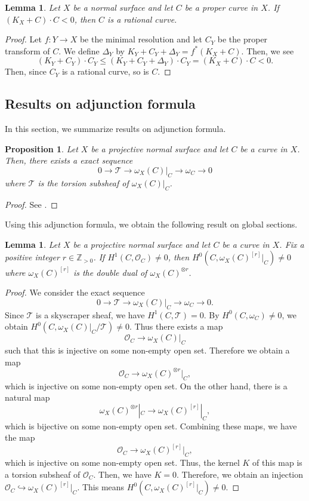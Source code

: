 \documentclass[12pt,twoside]{amsart}
\newtheorem{lem}[thm]{Lemma}
\newtheorem{prop}[thm]{Proposition}
\theoremstyle{definition}
\begin{document}
\begin{lem}\label{non-qcar-rational}
Let $X$ be a normal surface and 
let $C$ be a proper curve in $X$. 
If $(K_X+C)\cdot C<0$, then $C$ is a rational curve. 
\end{lem}

\begin{proof}
Let $f:Y\to X$ be the minimal resolution and 
let $C_Y$ be the proper transform of $C$. 
We define $\Delta_Y$ by $K_Y+C_Y+\Delta_Y=f^*(K_X+C).$ 
Then, we see 
$$(K_Y+C_Y)\cdot C_Y\leq (K_Y+C_Y+\Delta_Y)\cdot C_Y=(K_X+C)\cdot C<0.$$
Then, since $C_Y$ is a rational curve, so is $C$. 
\end{proof}


\subsection{Results on adjunction formula}
In this section, we summarize results on adjunction formula. 

\begin{prop}
Let $X$ be a projective normal surface and 
let $C$ be a curve in $X$. 
Then, there exists a exact sequence  
$$0\to \mathcal T \to \omega_X(C)|_C \to \omega_C \to 0$$
where $\mathcal T$ is the torsion subsheaf of $\omega_X(C)|_C$.
\end{prop}

\begin{proof}
See \cite[Lemma~4.4]{Fujino}.
\end{proof}

Using this adjunction formula, 
we obtain the following result on global sections. 

\begin{lem}\label{adjunctionlemma}
Let $X$ be a projective normal surface and 
let $C$ be a curve in $X$. 
Fix a positive integer $r\in\mathbb Z_{>0}$. 
If $H^1(C, \mathcal{O}_C)\neq 0$, then 
$H^0(C, \omega_X(C)^{[r]}|_C)\neq 0$ where 
$\omega_X(C)^{[r]}$ is the double dual of 
$\omega_X(C)^{\otimes r}$. 
\end{lem}

\begin{proof}
We consider the exact sequence 
$$0\to \mathcal T \to \omega_X(C)|_C \to \omega_C \to 0.$$
Since $\mathcal T$ is a skyscraper sheaf, we have 
$H^1(C, \mathcal T)=0$. 
By $H^0(C, \omega_C)\neq 0$, 
we obtain $H^0(C, \omega_X(C)|_C/\mathcal T)\neq 0$. 
Thus there exists a map
$$\mathcal O_{C} \to \omega_X(C)|_C$$
such that this is injective on some non-empty open set. 
Therefore we obtain a map
$$\mathcal O_{C} \to \omega_X(C)^{\otimes r}|_C,$$
which is injective on some non-empty open set. 
On the other hand, 
there is a natural map 
$$\omega_X(C)^{\otimes r}|_C \to \omega_X(C)^{[r]}|_C,$$
which is bijective on some non-empty open set. 
Combining these maps, we have the map 
$$\mathcal O_{C} \to \omega_X(C)^{[r]}|_C,$$
which is injective on some non-empty open set. 
Thus, the kernel $K$ of this map is a torsion subsheaf of $\mathcal O_C$. 
Then, we have $K=0$. 
Therefore, we obtain an injection $\mathcal O_{C} \hookrightarrow \omega_X(C)^{[r]}|_C.$ 
This means $H^0(C, \omega_X(C)^{[r]}|_C) \neq 0.$
\end{proof}
\end{document}
